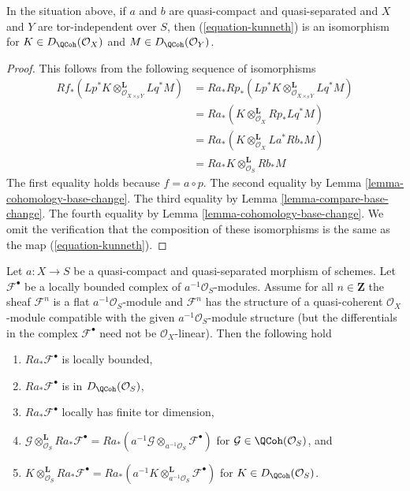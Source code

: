 \begin{lemma}
\label{lemma-kunneth}
In the situation above, if $a$ and $b$ are quasi-compact and quasi-separated
and $X$ and $Y$ are tor-independent over $S$, then (\ref{equation-kunneth})
is an isomorphism for $K \in D_\QCoh(\mathcal{O}_X)$ and
$M \in D_\QCoh(\mathcal{O}_Y)$.
\end{lemma}

\begin{proof}
This follows from the following sequence of isomorphisms
\begin{align*}
Rf_*(Lp^*K \otimes_{\mathcal{O}_{X \times_S Y}}^\mathbf{L} Lq^*M)
& =
Ra_*Rp_*(Lp^*K \otimes_{\mathcal{O}_{X \times_S Y}}^\mathbf{L} Lq^*M) \\
& =
Ra_*(K \otimes_{\mathcal{O}_X}^\mathbf{L} Rp_*Lq^*M) \\
& =
Ra_*(K \otimes_{\mathcal{O}_X}^\mathbf{L} La^*Rb_*M) \\
& =
Ra_*K \otimes_{\mathcal{O}_S}^\mathbf{L} Rb_*M
\end{align*}
The first equality holds because $f = a \circ p$. The second equality
by Lemma \ref{lemma-cohomology-base-change}. The third equality by
Lemma \ref{lemma-compare-base-change}.  The fourth equality by
Lemma \ref{lemma-cohomology-base-change}.
We omit the verification that the composition of these isomorphisms
is the same as the map (\ref{equation-kunneth}).
\end{proof}

\begin{lemma}
\label{lemma-cohomology-de-rham-base-change}
Let $a : X \to S$ be a quasi-compact and quasi-separated morphism
of schemes. Let $\mathcal{F}^\bullet$ be a locally bounded
complex of $a^{-1}\mathcal{O}_S$-modules. Assume for all $n \in \mathbf{Z}$
the sheaf $\mathcal{F}^n$ is a flat $a^{-1}\mathcal{O}_S$-module and
$\mathcal{F}^n$ has the structure of a quasi-coherent $\mathcal{O}_X$-module
compatible with the given $a^{-1}\mathcal{O}_S$-module structure (but the
differentials in the complex $\mathcal{F}^\bullet$ need not
be $\mathcal{O}_X$-linear). Then the following hold
\begin{enumerate}
\item $Ra_*\mathcal{F}^\bullet$ is locally bounded,
\item $Ra_*\mathcal{F}^\bullet$ is in $D_\QCoh(\mathcal{O}_S)$,
\item $Ra_*\mathcal{F}^\bullet$ locally has finite tor dimension,
\item $\mathcal{G} \otimes_{\mathcal{O}_S}^\mathbf{L} Ra_*\mathcal{F}^\bullet =
Ra_*(a^{-1}\mathcal{G} \otimes_{a^{-1}\mathcal{O}_S} \mathcal{F}^\bullet)$
for $\mathcal{G} \in \QCoh(\mathcal{O}_S)$, and
\item $K \otimes_{\mathcal{O}_S}^\mathbf{L} Ra_*\mathcal{F}^\bullet =
Ra_*(a^{-1}K \otimes_{a^{-1}\mathcal{O}_S}^\mathbf{L} \mathcal{F}^\bullet)$
for $K \in D_\QCoh(\mathcal{O}_S)$.
\end{enumerate}
\end{lemma}

